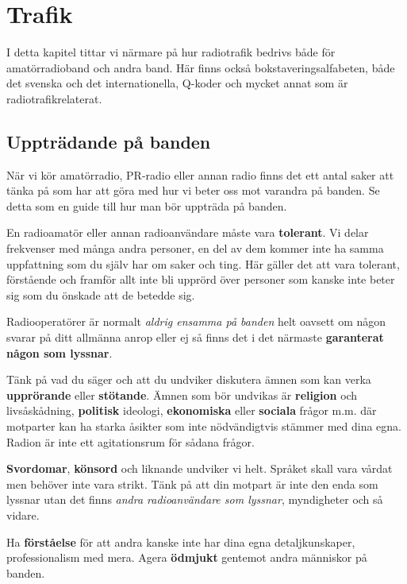 
\chapter{Trafik}

I detta kapitel tittar vi närmare på hur radiotrafik bedrivs både för
amatörradioband och andra band. Här finns också bokstaveringsalfabeten, både
det svenska och det internationella, Q-koder och mycket annat som är
radio\-trafik\-relaterat.

\vfill \minitoc

\section{Uppträdande på banden}

När vi kör amatörradio, PR-radio eller annan radio finns det ett antal saker
att tänka på som har att göra med hur vi beter oss mot varandra på banden. Se
detta som en guide till hur man bör uppträda på banden.

En radioamatör eller annan radioanvändare måste vara \textbf{tolerant}. Vi
delar frekvenser med många andra personer, en del av dem kommer inte ha samma
uppfattning som du själv har om saker och ting. Här gäller det att vara
tolerant, förstående och framför allt inte bli upprörd över personer som
kanske inte beter sig som du önskade att de betedde sig.

Radiooperatörer är normalt \emph{aldrig ensamma på banden} helt oavsett om
någon svarar på ditt allmänna anrop eller ej så finns det i det närmaste
\textbf{garanterat någon som lyssnar}.

Tänk på vad du säger och att du undviker diskutera ämnen som kan verka
\textbf{upprörande} eller \textbf{stötande}. Ämnen som bör undvikas är
\textbf{religion} och livs\-å\-skå\-d\-ni\-ng, \textbf{politisk} ideologi,
\textbf{ekonomiska} eller \textbf{sociala} frågor m.m. där motparter kan ha
starka åsikter som inte nödvändigtvis stämmer med dina egna. Radion är inte
ett agitationsrum för sådana frågor.

\textbf{Svordomar}, \textbf{könsord} och liknande undviker vi helt. Språket
skall vara vårdat men behöver inte vara strikt. Tänk på att din motpart är
inte den enda som lyssnar utan det finns \textit{andra radioanvändare som
lyssnar}, myndigheter och så vidare.

Ha \textbf{förståelse} för att andra kanske inte har dina egna
detaljkunskaper, professionalism med mera. Agera \textbf{ödmjukt} gentemot
andra människor på banden.

